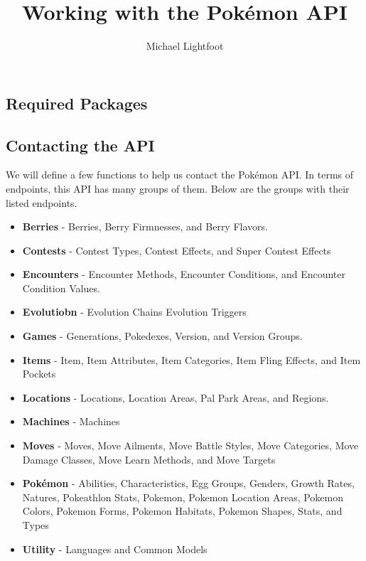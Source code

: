 \documentclass[
  12pt,
]{article}
\title{Working with the Pokémon API}
\author{Michael Lightfoot}
\date{}
\providecommand{\tightlist}{%
  \setlength{\itemsep}{0pt}\setlength{\parskip}{0pt}}
\begin{document}
\maketitle

\hypertarget{required-packages}{%
\subsection{Required Packages}\label{required-packages}}

\hypertarget{contacting-the-api}{%
\subsection{Contacting the API}\label{contacting-the-api}}

We will define a few functions to help us contact the Pokémon API. In
terms of endpoints, this API has many groups of them. Below are the
groups with their listed endpoints.

\begin{itemize}
\tightlist
\item
  \textbf{Berries} - Berries, Berry Firmnesses, and Berry Flavors.
\item
  \textbf{Contests} - Contest Types, Contest Effects, and Super Contest
  Effects
\item
  \textbf{Encounters} - Encounter Methods, Encounter Conditions, and
  Encounter Condition Values.
\item
  \textbf{Evolutiobn} - Evolution Chains Evolution Triggers
\item
  \textbf{Games} - Generations, Pokedexes, Version, and Version Groups.
\item
  \textbf{Items} - Item, Item Attributes, Item Categories, Item Fling
  Effects, and Item Pockets
\item
  \textbf{Locations} - Locations, Location Areas, Pal Park Areas, and
  Regions.
\item
  \textbf{Machines} - Machines
\item
  \textbf{Moves} - Moves, Move Ailments, Move Battle Styles, Move
  Categories, Move Damage Classes, Move Learn Methods, and Move Targets
\item
  \textbf{Pokémon} - Abilities, Characteristics, Egg Groups, Genders,
  Growth Rates, Natures, Pokeathlon Stats, Pokemon, Pokemon Location
  Areas, Pokemon Colors, Pokemon Forms, Pokemon Habitats, Pokemon
  Shapes, Stats, and Types
\item
  \textbf{Utility} - Languages and Common Models
\end{itemize}
\end{document}
